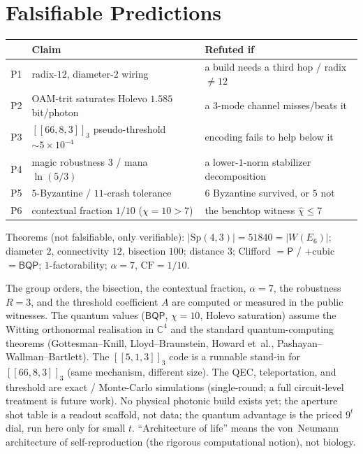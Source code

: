 \documentclass[11pt]{article}
\begin{document}
\section{Falsifiable Predictions}
\begin{center}
\begin{tabular}{l l l}
\toprule
& Claim & Refuted if\\
\midrule
P1 & radix-$12$, diameter-$2$ wiring & a build needs a third hop / radix $\ne12$\\
P2 & OAM-trit saturates Holevo $1.585$ bit/photon & a $3$-mode channel misses/beats it\\
P3 & $[[66,8,3]]_3$ pseudo-threshold $\sim5\times10^{-4}$ & encoding fails to help below it\\
P4 & magic robustness $3$ / mana $\ln(5/3)$ & a lower-$1$-norm stabilizer decomposition\\
P5 & $5$-Byzantine / $11$-crash tolerance & $6$ Byzantine survived, or $5$ not\\
P6 & contextual fraction $1/10$ ($\chi=10>7$) & the benchtop witness $\hat\chi\le7$\\
\bottomrule
\end{tabular}
\end{center}
Theorems (not falsifiable, only verifiable): $|\mathrm{Sp}(4,3)|=51840=|W(E_6)|$; diameter $2$,
connectivity $12$, bisection $100$; distance $3$; Clifford $=\mathsf{P}$ / $+$cubic $=\mathsf{BQP}$;
$1$-factorability; $\alpha=7$, $\mathrm{CF}=1/10$.

\begin{honestbox}
The group orders, the bisection, the contextual fraction, $\alpha=7$, the robustness $R=3$, and the
threshold coefficient $A$ are computed or measured in the public witnesses. The quantum values
($\mathsf{BQP}$, $\chi=10$, Holevo saturation) assume the Witting orthonormal realisation in $\mathbb{C}^4$
and the standard quantum-computing theorems (Gottesman--Knill, Lloyd--Braunstein, Howard et~al.,
Pashayan--Wallman--Bartlett). The $[[5,1,3]]_3$ code is a runnable stand-in for $[[66,8,3]]_3$ (same
mechanism, different size). The QEC, teleportation, and threshold are exact / Monte-Carlo simulations
(single-round; a full circuit-level treatment is future work). No physical photonic build exists yet;
the aperture shot table is a readout scaffold, not data; the quantum advantage is the priced $9^t$ dial,
run here only for small $t$. ``Architecture of life'' means the von~Neumann architecture of
self-reproduction (the rigorous computational notion), not biology.
\end{honestbox}
\end{document}
